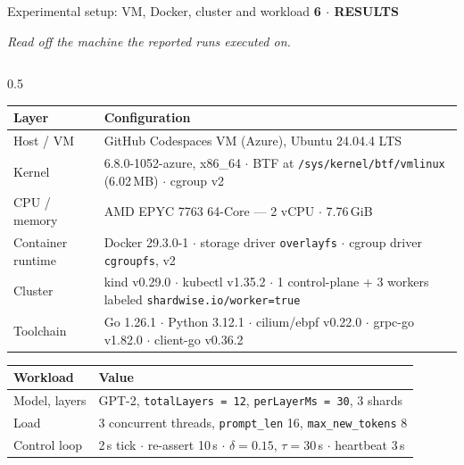 \documentclass[aspectratio=169,9pt]{beamer}
\newcommand{\kicker}[1]{{\scriptsize\color{keBlue}\bfseries\MakeUppercase{#1}}\par\vspace{0.2em}}
\begin{document}
\begin{frame}[shrink=25]{Experimental setup: VM, Docker, cluster and workload}
  \kicker{6 $\cdot$ Results}
  {\scriptsize\color{keMuted}\itshape Read off the machine the reported runs
  executed on.}
  \vspace{0.4em}
  \begin{columns}[T]
    \begin{column}{0.5\textwidth}
      \scriptsize
      \begin{tabularx}{\textwidth}{@{}p{1.8cm} X@{}}
        \toprule
        \color{keNavy}\bfseries Layer & \color{keNavy}\bfseries Configuration \\
        \midrule
        Host / VM & GitHub Codespaces VM (Azure), Ubuntu 24.04.4 LTS \\
        Kernel & 6.8.0-1052-azure, x86\_64 $\cdot$ BTF at
          \texttt{/sys/kernel/btf/vmlinux} (6.02\,MB) $\cdot$ cgroup v2 \\
        CPU / memory & AMD EPYC 7763 64-Core --- 2 vCPU $\cdot$ 7.76\,GiB \\
        Container runtime & Docker 29.3.0-1 $\cdot$ storage driver
          \texttt{overlayfs} $\cdot$ cgroup driver \texttt{cgroupfs}, v2 \\
        Cluster & kind v0.29.0 $\cdot$ kubectl v1.35.2 $\cdot$ 1 control-plane
          + 3 workers labeled \texttt{shardwise.io/worker=true} \\
        Toolchain & Go 1.26.1 $\cdot$ Python 3.12.1 $\cdot$ cilium/ebpf v0.22.0
          $\cdot$ grpc-go v1.82.0 $\cdot$ client-go v0.36.2 \\
        \bottomrule
      \end{tabularx}
      \vspace{0.5em}
      \begin{tabularx}{\textwidth}{@{}p{1.8cm} X@{}}
        \toprule
        \color{keNavy}\bfseries Workload & \color{keNavy}\bfseries Value \\
        \midrule
        Model, layers & GPT-2, \texttt{totalLayers = 12},
          \texttt{perLayerMs = 30}, 3 shards \\
        Load & 3 concurrent threads, \texttt{prompt\_len} 16,
          \texttt{max\_new\_tokens} 8 \\
        Control loop & 2\,s tick $\cdot$ re-assert 10\,s $\cdot$
          $\delta = 0.15$, $\tau = 30$\,s $\cdot$ heartbeat 3\,s \\
        \bottomrule
      \end{tabularx}
    \end{column}

\end{columns}
\end{frame}
\end{document}
